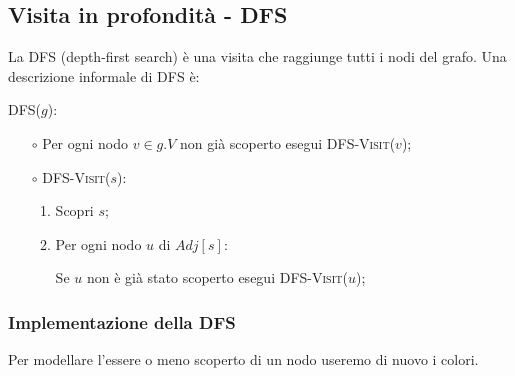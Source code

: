 \documentclass[a4paper,10pt]{article}
\theoremstyle{definition}
\begin{document}
\newpage
\subsection{Visita in profondità - DFS}
La DFS (depth-first search) è una visita che raggiunge tutti i nodi del grafo. Una descrizione informale di DFS è:\bigskip


DFS($g$):
\begin{enumerate}
 \item[$\circ$] Per ogni nodo $v\in g.V$  non già scoperto esegui \textsc{DFS-Visit}($v$);
 \item[$\circ$] \textsc{DFS-Visit}($s$):
 \begin{enumerate}
 \item Scopri $s$;
 \item Per ogni nodo $u$ di $Adj[s]$:
 
 \hspace{1cm}Se $u$ non è già stato scoperto esegui \textsc{DFS-Visit}($u$);
 \end{enumerate}

\end{enumerate}


\subsubsection{Implementazione della DFS}
Per modellare l'essere o meno scoperto di un nodo useremo di nuovo i colori.
\end{document}
